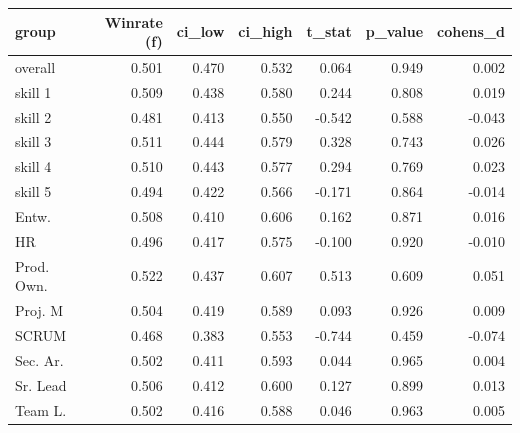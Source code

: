 \begin{tabular}{lrrrrrr}
\toprule
group & Winrate (f) & ci\_low & ci\_high & t\_stat & p\_value & cohens\_d \\
\midrule
overall & 0.501 & 0.470 & 0.532 & 0.064 & 0.949 & 0.002 \\
skill 1 & 0.509 & 0.438 & 0.580 & 0.244 & 0.808 & 0.019 \\
skill 2 & 0.481 & 0.413 & 0.550 & -0.542 & 0.588 & -0.043 \\
skill 3 & 0.511 & 0.444 & 0.579 & 0.328 & 0.743 & 0.026 \\
skill 4 & 0.510 & 0.443 & 0.577 & 0.294 & 0.769 & 0.023 \\
skill 5 & 0.494 & 0.422 & 0.566 & -0.171 & 0.864 & -0.014 \\
Entw. & 0.508 & 0.410 & 0.606 & 0.162 & 0.871 & 0.016 \\
HR & 0.496 & 0.417 & 0.575 & -0.100 & 0.920 & -0.010 \\
Prod. Own. & 0.522 & 0.437 & 0.607 & 0.513 & 0.609 & 0.051 \\
Proj. M & 0.504 & 0.419 & 0.589 & 0.093 & 0.926 & 0.009 \\
SCRUM & 0.468 & 0.383 & 0.553 & -0.744 & 0.459 & -0.074 \\
Sec. Ar. & 0.502 & 0.411 & 0.593 & 0.044 & 0.965 & 0.004 \\
Sr. Lead & 0.506 & 0.412 & 0.600 & 0.127 & 0.899 & 0.013 \\
Team L. & 0.502 & 0.416 & 0.588 & 0.046 & 0.963 & 0.005 \\
\bottomrule
\end{tabular}
